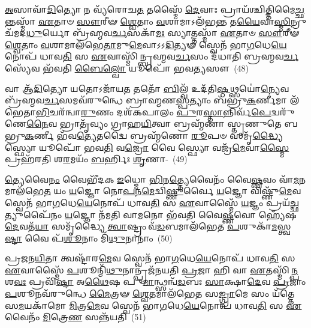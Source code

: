 {\anuvakamend[{\-\ul{𑌅}\-𑌭𑌿 𑌖\-\ul{𑌲𑍁} 𑌵𑍃\-\ul{𑌷𑍍𑌟𑌿}\-𑌶𑍍𑌛𑌨𑍍𑌦᳴𑌸𑌾\-\ul{𑌮𑍇}\-𑌵 𑌰𑌸𑍇᳴𑌨 \ul{𑌪𑍍𑌰}\-𑌜𑌾𑌮𑌵᳴ 𑌵𑍈𑌶𑍍𑌵\-\ul{𑌦𑍇}\-𑌵𑌾 𑌵𑍈 𑌬𑍍𑌰᳴𑌹𑍍𑌮𑌵\-\ul{𑌰𑍍𑌚}\-𑌸𑌂 𑌯𑍂\-\ul{𑌪} 𑌏\-\ul{𑌕𑌾}\-𑌨𑍍𑌨𑌵𑌿𑍞᳴\-\ul{𑌶}\-𑌤𑌿𑌶𑍍𑌚᳴।~(7)।}]}

\-\ul{𑌅}\-𑌸𑌾𑌵𑌾᳴\-\ul{𑌦𑌿}\-𑌤𑍍𑌯𑍋 𑌨 𑌵𑍍𑌯᳴𑌰𑍋𑌚\-\ul{𑌤} 𑌤𑌸𑍍𑌮𑍈᳴ \ul{𑌦𑍇}\-𑌵𑌾𑌃 𑌪𑍍𑌰𑌾𑌯᳴𑌶𑍍𑌚𑌿𑌤𑍍𑌤𑌿\-𑌮𑍈\-\ul{𑌚𑍍𑌛}\-𑌨𑍍𑌤𑌸𑍍𑌮𑌾᳴ \ul{𑌏}\-𑌤𑌾𑍞 \ul{𑌸𑍗}\-𑌰𑍀𑍟 \ul{𑌶𑍍𑌵𑍇}\-𑌤𑌾𑌂 \ul{𑌵}\-𑌶𑌾𑌮𑌾\-𑌽𑌲᳴𑌭\-\ul{𑌨𑍍𑌤} 𑌤\-\ul{𑌯𑍈}\-𑌵𑌾\-\ul{𑌸𑍍𑌮𑌿}\-𑌨𑍍𑌰𑍁𑌚᳴𑌮𑌦\-\ul{𑌧𑍁}\-𑌰𑍍𑌯𑍋 𑌬𑍍𑌰᳴𑌹𑍍𑌮𑌵\-\ul{𑌰𑍍𑌚}\-𑌸𑌕𑌾᳴\-\ul{𑌮𑌃} 𑌸𑍍𑌯𑌾𑌤𑍍𑌤𑌸𑍍𑌮𑌾᳴ \ul{𑌏}\-𑌤𑌾𑍞 \ul{𑌸𑍗}\-𑌰𑍀𑍟 \ul{𑌶𑍍𑌵𑍇}\-𑌤𑌾𑌂 \ul{𑌵}\-𑌶𑌾𑌮𑌾𑌲᳴𑌭𑍇\-\ul{𑌤𑌾}\-𑌮𑍁\-\ul{𑌮𑍇}\-𑌵𑌾𑌽𑌽\-\ul{𑌦𑌿}\-𑌤𑍍𑌯𑍟 𑌸𑍍𑌵𑍇𑌨᳴ 𑌭𑌾\-\ul{𑌗}\-𑌧𑍇\-\ul{𑌯𑍇}\-𑌨𑍋𑌪᳴ 𑌧𑌾𑌵\-\ul{𑌤𑌿} 𑌸 \ul{𑌏}\-𑌵𑌾𑌸𑍍𑌮𑌿᳴𑌨𑍍𑌬𑍍𑌰𑌹𑍍𑌮𑌵\-\ul{𑌰𑍍𑌚}\-𑌸𑌂 𑌦᳴𑌧𑌾𑌤𑌿 𑌬𑍍𑌰𑌹𑍍𑌮𑌵\-\ul{𑌰𑍍𑌚}\-𑌸𑍍𑌯𑍇᳴𑌵 𑌭᳴𑌵𑌤𑌿 \ul{𑌬𑍈}\-\-\ul{𑌲𑍍}\-\mbox{}𑌵𑍋 𑌯𑍂𑌪𑍋᳴ 𑌭𑌵\-\ul{𑌤𑍍𑌯}\-𑌸𑍗~(48)

𑌵𑌾 𑌆᳴\-\ul{𑌦𑌿}\-𑌤𑍍𑌯𑍋 𑌯𑌤𑍋\-𑌽𑌜𑌾᳴𑌯\-\ul{𑌤} 𑌤𑌤𑍋᳴ \ul{𑌬𑌿}\-𑌲𑍍𑌵᳴ 𑌉𑌦᳴𑌤𑌿\-\ul{𑌷𑍍𑌠}\-𑌥𑍍𑌸𑌯𑍋॑\-\ul{𑌨𑍍𑌯𑍇}\-𑌵 𑌬𑍍𑌰᳴𑌹𑍍𑌮𑌵\-\ul{𑌰𑍍𑌚}\-𑌸𑌮𑌵᳴\-𑌰𑍁𑌨𑍍𑌧𑍇 𑌬𑍍𑌰𑌾𑌹𑍍𑌮𑌣\-\ul{𑌸𑍍𑌪}\-𑌤𑍍𑌯𑌾𑌂 𑌬᳴𑌭𑍍𑌰𑍁\-\ul{𑌕}\-𑌰𑍍𑌣𑍀𑌮𑌾 𑌲᳴𑌭𑍇𑌤𑌾\-\ul{𑌭𑌿}\-\-𑌚𑌰᳴𑌨𑍍𑌵𑌾\-\ul{𑌰𑍁}\-𑌣𑌂 𑌦𑌶᳴\-𑌕𑌪𑌾𑌲𑌂 \ul{𑌪𑍁}\-𑌰\-\ul{𑌸𑍍𑌤𑌾}\-𑌨𑍍𑌨𑌿𑌰𑍍𑌵᳴\-\ul{𑌪𑍇}\-𑌦𑍍𑌵𑌰𑍁᳴𑌣𑍇\-\ul{𑌨𑍈}\-𑌵 𑌭𑍍𑌰𑌾𑌤𑍃᳴𑌵𑍍𑌯𑌂 𑌗𑍍𑌰𑌾𑌹\-\ul{𑌯𑌿}\-𑌤𑍍𑌵𑌾 𑌬𑍍𑌰𑌹𑍍𑌮᳴𑌣𑌾 𑌸𑍍𑌤𑍃𑌣𑍁𑌤𑍇 𑌬𑌭𑍍𑌰𑍁\-\ul{𑌕}\-𑌰𑍍𑌣𑍀 𑌭᳴𑌵\-\ul{𑌤𑍍𑌯𑍇}\-𑌤𑌦𑍍𑌵𑍈 𑌬𑍍𑌰𑌹𑍍𑌮᳴𑌣𑍋 \ul{𑌰𑍂}\-𑌪𑍞 𑌸𑌮𑍃᳴\-\ul{𑌦𑍍𑌧𑍍𑌯𑍈} 𑌸𑍍𑌫𑍍𑌯𑍋 𑌯𑍂𑌪𑍋᳴ 𑌭𑌵\-\ul{𑌤𑌿} 𑌵\-\ul{𑌜𑍍𑌰𑍋} 𑌵𑍈 𑌸𑍍𑌫𑍍𑌯𑍋 𑌵𑌜𑍍𑌰᳴\-\ul{𑌮𑍇}\-𑌵𑌾\-\ul{𑌸𑍍𑌮𑍈} 𑌪𑍍𑌰𑌹᳴𑌰𑌤𑌿 𑌶\-\ul{𑌰}\-𑌮𑌯𑌂᳴ \ul{𑌬}\-𑌰𑍍\mbox{}𑌹𑌿𑌃 \ul{𑌶𑍃}\-𑌣𑌾-~(49)

\-\ul{𑌤𑍍𑌯𑍇}\-𑌵𑍈\-\ul{𑌨𑌂} 𑌵𑍈𑌭𑍀᳴𑌦𑌕 \ul{𑌇}\-𑌧𑍍𑌮𑍋 \ul{𑌭𑌿}\-𑌨\-\ul{𑌤𑍍𑌤𑍍𑌯𑍇}\-𑌵𑍈𑌨𑌂᳴ 𑌵𑍈\-\ul{𑌷𑍍𑌣}\-𑌵𑌂 𑌵𑌾᳴\-\ul{𑌮}\-𑌨𑌮𑌾\-𑌲᳴𑌭𑍇\-\ul{𑌤} 𑌯𑌂 \ul{𑌯}\-𑌜𑍍𑌞𑍋 𑌨𑍋\-\ul{𑌪}\-𑌨\-\ul{𑌮𑍇}\-𑌦𑍍𑌵𑌿\-\ul{𑌷𑍍𑌣𑍁}\-𑌰𑍍𑌵𑍈 \ul{𑌯}\-𑌜𑍍𑌞𑍋 𑌵𑌿𑌷𑍍𑌣𑍁᳴\-\ul{𑌮𑍇}\-𑌵 𑌸𑍍𑌵𑍇𑌨᳴ 𑌭𑌾\-\ul{𑌗}\-𑌧𑍇\-\ul{𑌯𑍇}\-𑌨𑍋𑌪᳴ 𑌧𑌾𑌵\-\ul{𑌤𑌿} 𑌸 \ul{𑌏}\-𑌵𑌾𑌸𑍍𑌮𑍈᳴ \ul{𑌯}\-𑌜𑍍𑌞𑌂 𑌪𑍍𑌰𑌯᳴\-\ul{𑌚𑍍𑌛}\-𑌤𑍍𑌯𑍁𑌪𑍈᳴𑌨𑌂 \ul{𑌯}\-𑌜𑍍𑌞𑍋 𑌨᳴𑌮𑌤𑌿 𑌵𑌾\-\ul{𑌮}\-𑌨𑍋 𑌭᳴𑌵𑌤𑌿 𑌵𑍈\-\ul{𑌷𑍍𑌣}\-𑌵𑍋 𑌹𑍍𑌯𑍇᳴𑌷 \ul{𑌦𑍇}\-𑌵𑌤᳴\-\ul{𑌯𑌾} 𑌸𑌮𑍃᳴𑌦𑍍𑌧𑍍𑌯𑍈 \ul{𑌤𑍍𑌵𑌾}\-𑌷𑍍𑌟𑍍𑌰𑌂 𑌵᳴\-\ul{𑌡}\-𑌬𑌮𑌾𑌲᳴𑌭𑍇𑌤 \ul{𑌪}\-𑌶𑍁𑌕𑌾᳴\-\ul{𑌮}\-𑌸𑍍𑌤𑍍𑌵\-\ul{𑌷𑍍𑌟𑌾} 𑌵𑍈 𑌪᳴\-\ul{𑌶𑍂}\-𑌨𑌾𑌂 𑌮𑌿᳴\-\ul{𑌥𑍁}\-𑌨𑌾𑌨𑌾𑌂॑~(50)

𑌪𑍍𑌰𑌜𑌨\-\ul{𑌯𑌿}\-𑌤𑌾 𑌤𑍍𑌵𑌷𑍍𑌟𑌾᳴𑌰\-\ul{𑌮𑍇}\-𑌵 𑌸𑍍𑌵𑍇𑌨᳴ 𑌭𑌾\-\ul{𑌗}\-𑌧𑍇\-\ul{𑌯𑍇}\-𑌨𑍋𑌪᳴ 𑌧𑌾𑌵\-\ul{𑌤𑌿} 𑌸 \ul{𑌏}\-𑌵𑌾𑌸𑍍𑌮𑍈᳴ \ul{𑌪}\-𑌶𑍂𑌨𑍍𑌮𑌿᳴\-\ul{𑌥𑍁}\-𑌨𑌾𑌨𑍍𑌪𑍍𑌰𑌜᳴𑌨𑌯𑌤𑌿 \ul{𑌪𑍍𑌰}\-𑌜𑌾 𑌹𑌿 𑌵𑌾 \ul{𑌏}\-𑌤𑌸𑍍𑌮𑌿᳴\-\ul{𑌨𑍍𑌪}\-𑌶\-\ul{𑌵𑌃} 𑌪𑍍𑌰𑌵𑌿᳴\-\ul{𑌷𑍍𑌟𑌾} 𑌅\-\ul{𑌥𑍈}\-𑌷 𑌪𑍁\-\ul{𑌮𑌾}\-𑌨𑍍𑌥𑍍𑌸𑌨𑍍𑌵᳴\-\ul{𑌡}\-𑌬𑌃 \ul{𑌸𑌾}\-𑌕𑍍𑌷𑌾\-\ul{𑌦𑍇}\-𑌵 \ul{𑌪𑍍𑌰}\-𑌜𑌾𑌂 \ul{𑌪}\-𑌶𑍂𑌨𑌵᳴\-𑌰𑍁𑌨𑍍𑌧𑍇 \ul{𑌮𑍈}\-𑌤𑍍𑌰𑍟 \ul{𑌶𑍍𑌵𑍇}\-𑌤𑌮𑌾𑌲᳴𑌭𑍇𑌤 𑌸\-\ul{𑌙𑍍𑌗𑍍𑌰𑌾}\-𑌮𑍇 𑌸𑌂 𑌯᳴𑌤𑍍𑌤𑍇 𑌸\-\ul{𑌮}\-𑌯𑌕𑌾᳴𑌮𑍋 \ul{𑌮𑌿}\-𑌤𑍍𑌰\-\ul{𑌮𑍇}\-𑌵 𑌸𑍍𑌵𑍇𑌨᳴ 𑌭𑌾\-\ul{𑌗}\-𑌧𑍇\-\ul{𑌯𑍇}\-𑌨𑍋𑌪᳴ 𑌧𑌾𑌵\-\ul{𑌤𑌿} 𑌸 \ul{𑌏}\-𑌵𑍈𑌨𑌂᳴ \ul{𑌮𑌿}\-𑌤𑍍𑌰𑍇\-\ul{𑌣} 𑌸𑌨𑍍𑌨᳴𑌯𑌤𑌿~(51)

